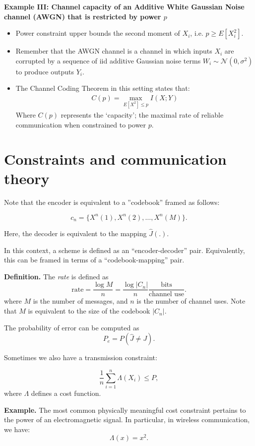 \documentclass[12pt]{extarticle}
\newcommand{\eq}[1]{\begin{align*}#1\end{align*}}
\begin{document}
\noindent\textbf{Example III:  Channel capacity of an Additive White Gaussian Noise channel (AWGN) that is restricted by power $p$}
\begin{itemize}
\item Power constraint upper bounds the second moment of $X_i$, i.e. $p \geq E\left[ X_i^2\right]$.
\item Remember that the AWGN channel is a channel in which inputs $X_i$ are corrupted by a sequence of iid additive Gaussian noise terms $W_i \sim \mathcal{N}(0, \sigma^2)$ to produce outputs $Y_i$.
\item The Channel Coding Theorem in this setting states that:
\eq{
C(p) = \max_{E[X^2] \leq p} I(X ; Y)
}
Where $C(p)$ represents the `capacity'; the maximal rate of reliable communication when constrained to power $p$.

\end{itemize}

\section{Constraints and communication theory}

Note that the encoder is equivalent to a ''codebook'' framed as follows:

\[
  c_n = \{ X^n (1), X^n (2), \dots, X^n (M) \}.
\]

Here, the decoder is equivalent to the mapping $\hat{J}(.)$.

In this context, a scheme is defined as an ``encoder-decoder'' pair.  Equivalently, this can be framed in terms of a ``codebook-mapping'' pair.

{\bf Definition.} The {\it rate} is defined as
\[
  \text{rate} = \frac{\log M}{n} = \frac{\log |C_n|}{n} \frac{\text{bits}}{\text{channel use}}.
\]
where $M$ is the number of messages, and $n$ is the number of channel uses.  Note that $M$ is equivalent to the size of the codebook $|C_n|$.

The probability of error can be computed as
\[
  P_e = P(\hat{J} \neq J).
\]

Sometimes we also have a transmission constraint:

\[
  \frac{1}{n} \sum_{i=1}^{n} \Lambda (X_i) \leq P,
\]
where $\Lambda$ defines a cost function.  

{\bf Example.} The most common physically meaningful cost constraint pertains to the power of an electromagnetic signal.  In particular, in wireless communication, we have:
\[
  \Lambda (x) = x^2.
\]
\end{document}
